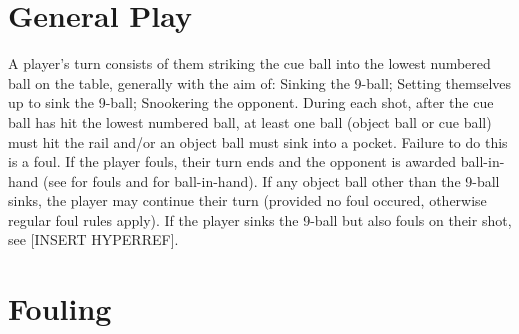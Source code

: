 \section{General Play} \label{9ball:general}

 A player's turn consists of them striking the cue ball into the lowest numbered ball on the table, generally with the aim of:%
\subsubruleitem Sinking the 9-ball;%
\subsubruleitem Setting themselves up to sink the 9-ball;%
\subsubruleitem Snookering the opponent.%
 During each shot, after the cue ball has hit the lowest numbered ball, at least one ball (object ball or cue ball) must hit the rail and/or an object ball must sink into a pocket. Failure to do this is a foul.
 \FootOnGround%
 If the player fouls, their turn ends and the opponent is awarded ball-in-hand (see  for fouls and  for ball-in-hand).%
 If any object ball other than the 9-ball sinks, the player may continue their turn (provided no foul occured, otherwise regular foul rules apply).%
 If the player sinks the 9-ball but also fouls on their shot, see [INSERT HYPERREF].%
 \AlternateTurns[9ball]%

\section{Fouling} \label{9ball:fouling}

